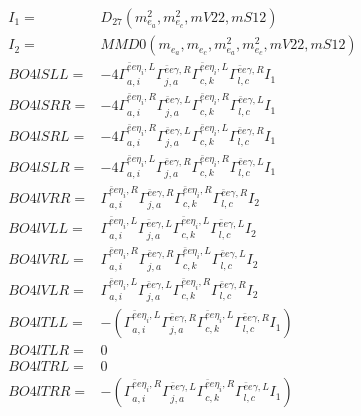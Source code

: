 \documentclass[A4,landscape]{article}
\begin{document}
\begin{align} 
I_1 = & D_{27}(m^2_{e_{{a}}}, m^2_{e_{{c}}}, mV22, mS12) \\ 
I_2 = & MMD0(m_{e_{{a}}}, m_{e_{{c}}}, m^2_{e_{{a}}}, m^2_{e_{{c}}}, mV22, mS12) \\ 
  BO4lSLL= & -4  \Gamma^{\bar{e}e \eta_i ,L}_{a, i} \Gamma^{\bar{e}e \gamma ,R}_{j, a} \Gamma^{\bar{e}e \eta_i ,L}_{c, k} \Gamma^{\bar{e}e \gamma ,R}_{l, c} I_1 \\ 
  BO4lSRR= & -4  \Gamma^{\bar{e}e \eta_i ,R}_{a, i} \Gamma^{\bar{e}e \gamma ,L}_{j, a} \Gamma^{\bar{e}e \eta_i ,R}_{c, k} \Gamma^{\bar{e}e \gamma ,L}_{l, c} I_1 \\ 
  BO4lSRL= & -4  \Gamma^{\bar{e}e \eta_i ,R}_{a, i} \Gamma^{\bar{e}e \gamma ,L}_{j, a} \Gamma^{\bar{e}e \eta_i ,L}_{c, k} \Gamma^{\bar{e}e \gamma ,R}_{l, c} I_1 \\ 
  BO4lSLR= & -4  \Gamma^{\bar{e}e \eta_i ,L}_{a, i} \Gamma^{\bar{e}e \gamma ,R}_{j, a} \Gamma^{\bar{e}e \eta_i ,R}_{c, k} \Gamma^{\bar{e}e \gamma ,L}_{l, c} I_1 \\ 
  BO4lVRR= &  \Gamma^{\bar{e}e \eta_i ,R}_{a, i} \Gamma^{\bar{e}e \gamma ,R}_{j, a} \Gamma^{\bar{e}e \eta_i ,R}_{c, k} \Gamma^{\bar{e}e \gamma ,R}_{l, c} I_2 \\ 
  BO4lVLL= &  \Gamma^{\bar{e}e \eta_i ,L}_{a, i} \Gamma^{\bar{e}e \gamma ,L}_{j, a} \Gamma^{\bar{e}e \eta_i ,L}_{c, k} \Gamma^{\bar{e}e \gamma ,L}_{l, c} I_2 \\ 
  BO4lVRL= &  \Gamma^{\bar{e}e \eta_i ,R}_{a, i} \Gamma^{\bar{e}e \gamma ,R}_{j, a} \Gamma^{\bar{e}e \eta_i ,L}_{c, k} \Gamma^{\bar{e}e \gamma ,L}_{l, c} I_2 \\ 
  BO4lVLR= &  \Gamma^{\bar{e}e \eta_i ,L}_{a, i} \Gamma^{\bar{e}e \gamma ,L}_{j, a} \Gamma^{\bar{e}e \eta_i ,R}_{c, k} \Gamma^{\bar{e}e \gamma ,R}_{l, c} I_2 \\ 
  BO4lTLL= & -( \Gamma^{\bar{e}e \eta_i ,L}_{a, i} \Gamma^{\bar{e}e \gamma ,R}_{j, a} \Gamma^{\bar{e}e \eta_i ,L}_{c, k} \Gamma^{\bar{e}e \gamma ,R}_{l, c} I_1) \\ 
  BO4lTLR= & 0 \\ 
  BO4lTRL= & 0 \\ 
  BO4lTRR= & -( \Gamma^{\bar{e}e \eta_i ,R}_{a, i} \Gamma^{\bar{e}e \gamma ,L}_{j, a} \Gamma^{\bar{e}e \eta_i ,R}_{c, k} \Gamma^{\bar{e}e \gamma ,L}_{l, c} I_1) \\ 
\end{align} 
\end{document}
